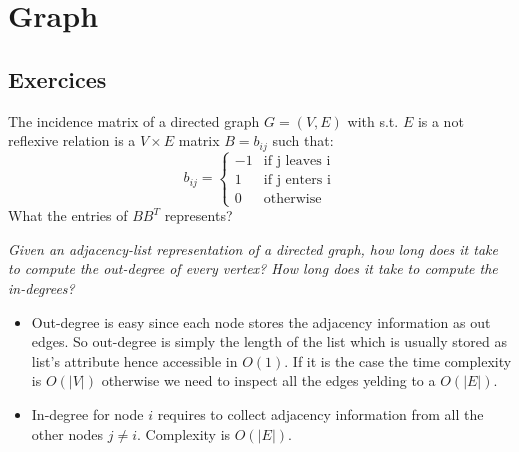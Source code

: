 \chapter{Graph}


\section{Exercices}

\begin{problem}
The incidence matrix of a directed graph $G=(V,E)$ with s.t. $E$ is a not reflexive relation  is a
$V \times E$ matrix $B = b_{ij}$ such that:
\[
    b_{ij}=\left\{
                \begin{array}{ll}
                  -1 &\text{if j leaves i}\\
                  1 &\text{if j enters i}\\
                  0 &\text{otherwise}
                \end{array}
              \right.
  \]
What the entries of $BB^T$ represents?

	\begin{solution}
	
	\end{solution}
\end{problem}





\begin{problem}
\textit{Given an adjacency-list representation of a directed graph, how long does it take
to compute the out-degree of every vertex? How long does it take to compute the
in-degrees?}

	\begin{solution}
\begin{itemize}
\item Out-degree is easy since each node stores the adjacency information as out edges. So out-degree is simply the length of the list which is usually stored as list's attribute hence accessible in $O(1)$. If it 
is the case the time complexity is $O(|V|)$ otherwise we need to inspect all the edges yelding to a $O(|E|)$. 
\item In-degree for node $i$ requires to collect adjacency information from all the other nodes $j \neq i$. Complexity is $O(|E|)$.
\end{itemize}

	\end{solution}
\end{problem}




